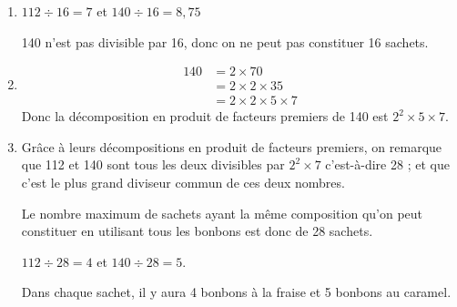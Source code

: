 \begin{enumerate}
	\item $112\div 16=7$ et $140\div 16 =8,75$

	140 n'est pas divisible par 16, donc on ne peut pas constituer 16 sachets.
	\item \begin{align*}
	140&=2\times 70\\
	&=2\times 2\times 35\\
	&=2\times 2\times 5\times 7
	\end{align*}
	Donc la décomposition en produit de facteurs premiers de 140 est $2^2\times 5\times 7$.
	\item Grâce à leurs décompositions en produit de facteurs premiers, on remarque que 112 et 140 sont tous les deux divisibles par $2^2\times 7$ c'est-à-dire 28 ; et que c'est le plus grand diviseur commun de ces deux nombres.

	Le nombre maximum de sachets ayant la même composition qu'on peut constituer en utilisant tous les bonbons est donc de 28 sachets.

	$112\div 28 =4$ et $140\div 28=5$.

	Dans chaque sachet, il y aura 4 bonbons à la fraise et 5 bonbons au caramel.
\end{enumerate}

